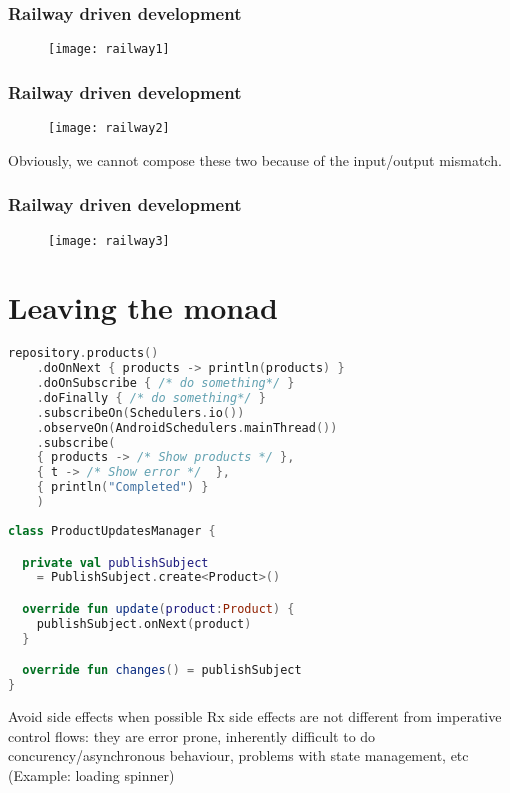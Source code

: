 \documentclass[10pt]{beamer}
\begin{document}
\begin{frame}\frametitle{Railway driven development}
	\begin{figure}
		\centering
		\texttt{[image: railway1]}
	\end{figure}
\end{frame}
\begin{frame}\frametitle{Railway driven development}
	\begin{figure}
		\centering
		\texttt{[image: railway2]}
	\end{figure}
	Obviously, we cannot compose these two because of the input/output mismatch.
\end{frame}
\begin{frame}\frametitle{Railway driven development}
	\begin{figure}
		\centering
		\texttt{[image: railway3]}
	\end{figure}
\end{frame}
\section{Leaving the monad}
\begin{frame}[fragile]
\begin{lstlisting}[language=Kotlin, basicstyle=\ttfamily]
repository.products()
    .doOnNext { products -> println(products) }
    .doOnSubscribe { /* do something*/ }
    .doFinally { /* do something*/ }
    .subscribeOn(Schedulers.io())
    .observeOn(AndroidSchedulers.mainThread())
    .subscribe(
    { products -> /* Show products */ },
    { t -> /* Show error */  },
    { println("Completed") }
    )
\end{lstlisting}
\end{frame}

\begin{frame}[fragile]
\begin{lstlisting}[language=Kotlin, basicstyle=\ttfamily]
class ProductUpdatesManager {

  private val publishSubject
 	= PublishSubject.create<Product>()

  override fun update(product:Product) {
    publishSubject.onNext(product)
  }

  override fun changes() = publishSubject
}
\end{lstlisting}
\end{frame}
\begin{frame}
	\begin{alertblock}
	{Avoid side effects when possible}
	Rx side effects are not different from imperative control flows: they are error prone, inherently difficult to do concurency/asynchronous behaviour, problems with state management, etc (Example: loading spinner) 
	\end{alertblock}
\end{frame}
\end{document}
